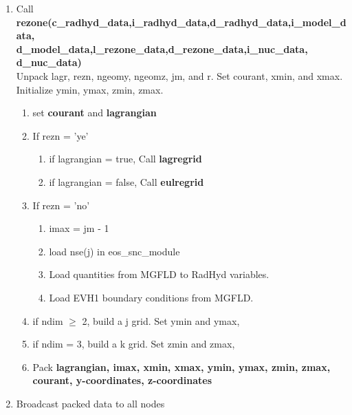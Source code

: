 \documentclass[11pt,doublespace]{article}
\begin{document}
\begin{itemize}
\begin{enumerate}
\begin{enumerate}
  \item Call {\bf rezone(c\_radhyd\_data,i\_radhyd\_data,d\_radhyd\_data,i\_model\_data,\\
  d\_model\_data,l\_rezone\_data,d\_rezone\_data,i\_nuc\_data, d\_nuc\_data)}\\
  Unpack lagr, rezn, ngeomy, ngeomz, jm, and r. Set courant, xmin, and xmax.\\
  Initialize ymin, ymax, zmin, zmax.
\begin{enumerate}
  \item set {\bf courant} and {\bf lagrangian}
  \item If rezn = 'ye'
\begin{enumerate}
  \item if  lagrangian = true, Call {\bf lagregrid}
  \item if   lagrangian = false, Call {\bf eulregrid}
\end{enumerate}
  \item If rezn = 'no'
\begin{enumerate}
  \item imax = jm - 1
  \item load nse(j) in eos\_snc\_module
  \item Load quantities from MGFLD to RadHyd variables.
  \item Load EVH1 boundary conditions from MGFLD.
\end{enumerate}
  \item if ndim $\ge$ 2, build a j grid. Set ymin and ymax,
  \item if ndim = 3, build a k grid. Set zmin and zmax,
  \item Pack {\bf lagrangian, imax, xmin, xmax, ymin, ymax, zmin, zmax, courant, y-coordinates, z-coordinates}
\end{enumerate}

  \item Broadcast packed data to all nodes


\end{enumerate}
\end{enumerate}
\end{itemize}
\end{document}
